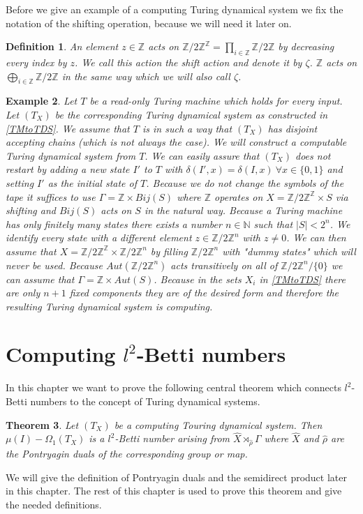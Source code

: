 \documentclass[12pt,a4paper]{scrartcl}
\newtheorem{Theorem}{Theorem}[section]
\newtheorem{Definition}[Theorem]{Definition}
\newtheorem{Example}[Theorem]{Example}
\numberwithin{equation}{section}
\newcommand{\Z}{\mathbb{Z}} %
\newcommand{\N}{\mathbb{N}} %
\newcommand{\2}{\mathbb{Z} / 2 \mathbb{Z}}
\newcommand{\1}{\overline{1}}
\newcommand{\0}{\overline{0}}
\begin{document}
Before we give an example of a computing Turing dynamical system we fix the notation of the shifting operation, because we will need it later on.
\begin{Definition} \label{shift}
	An element $z \in \Z$ acts on $\2^{\Z} = \prod_{i \in \Z} \2$ by decreasing every index by $z$. We call this action the shift action and denote it by $\zeta$. $\Z$ acts on $\bigoplus_{i \in \Z} \2$ in the same way which we will also call $\zeta$.
\end{Definition}
\begin{Example} \label{roTMtoTDS}
	Let $T$ be a read-only Turing machine which holds for every input. Let $(T_X)$ be the corresponding Turing dynamical system as constructed in \ref{TMtoTDS}. We assume that $T$ is in such a way that $(T_X)$ has disjoint accepting chains (which is not always the case). We will construct a computable Turing dynamical system from $T$.  We can easily assure that $(T_X)$ does not restart by adding a new state $I'$ to $T$ with $\delta(I', x) = \delta(I, x) \ \forall x \in \{0,1\}$ and setting $I'$ as the initial state of $T$. Because we do not change the symbols of the tape it suffices to use $\Gamma = \Z \times Bij(S)$ where $\Z$ operates on $X = \2^\Z \times S$ via shifting and $Bij(S)$ acts on $S$ in the natural way. Because a Turing machine has only finitely many states there exists a number $n \in \N$ such that $|S| < 2^n$. We identify every state with a different element $z \in \2^n$ with $z \neq 0$. We can then assume that $X = \2^\Z \times \2^n$ by filling $\2^n$ with "dummy states" which will never be used. Because $Aut(\2^n)$ acts transitively on all of $\2^n / \{0\}$ we can assume that $\Gamma = \Z \times Aut(S)$. Because in the sets $X_i$ in \ref{TMtoTDS} there are only $n+1$ fixed components they are of the desired form and therefore the resulting Turing dynamical system is computing.
\end{Example}


\section{Computing $l^2$-Betti numbers}
In this chapter we want to prove the following central theorem which connects $l^2$-Betti numbers to the concept of Turing dynamical systems.
\begin{Theorem} \label{HS}
	Let $(T_X)$ be a computing Touring dynamical system. Then $\mu (I) - \Omega_1(T_X)$ is a $l^2$-Betti number arising from $\hat{X} \rtimes_{\hat{\rho}} \Gamma$ where $\hat{X}$ and $\hat{\rho}$ are the Pontryagin duals of the corresponding group or map.
\end{Theorem}
We will give the definition of Pontryagin duals and the semidirect product later in this chapter. The rest of this chapter is used to prove this theorem and give the needed definitions.
\end{document}
